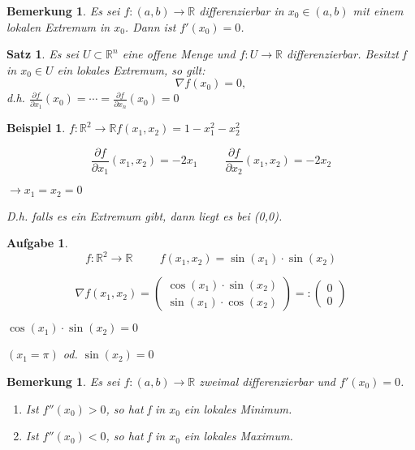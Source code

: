 \documentclass[12pt,a4paper]{scrreprt}
\newtheorem{bemerkung}[defi]{Bemerkung}
\newtheorem{beispiel}[defi]{Beispiel}
\newtheorem{satz}[defi]{Satz}
\newtheorem{aufg}[defi]{Aufgabe}
\begin{document}
\begin{bemerkung}
	Es sei $f:(a,b)\to\mathbb{R}$ differenzierbar in $x_0\in (a,b)$ mit einem lokalen Extremum in $x_0$. Dann ist $f'(x_0)=0$.
\end{bemerkung}

\begin{satz}
	Es sei $U \subset \mathbb{R}^n$ eine offene Menge und $f:U\to\mathbb{R}$ differenzierbar. Besitzt f in $x_0\in U$ ein lokales Extremum, so gilt:
	\[\nabla f(x_0)=0,\]
	d.h. $\frac{\partial f}{\partial x_1}(x_0)=\cdots=\frac{\partial f}{\partial x_n}(x_0)=0$
\end{satz}

\begin{beispiel}
	$f:\mathbb{R}^2\to\mathbb{R}$\hspace{1cm}$f(x_1,x_2)=1-x_1^2-x_2^2$
	
	\[\frac{\partial f}{\partial x_1}(x_1,x_2)=-2x_1\hspace{1cm}\frac{\partial f}{\partial x_2}(x_1,x_2)=-2x_2\]
	
	$\to x_1=x_2=0$
	
	D.h. falls es ein Extremum gibt, dann liegt es bei (0,0).
\end{beispiel}

\begin{aufg}
	\[f:\mathbb{R}^2\to\mathbb{R}\hspace{1cm}f(x_1,x_2)=\sin(x_1)\cdot\sin(x_2)\]

	\[\nabla f(x_1,x_2)=\begin{pmatrix}
		\cos(x_1)\cdot\sin(x_2) \\
		\sin(x_1)\cdot\cos(x_2)
	\end{pmatrix} =: \begin{pmatrix}0 \\ 0\end{pmatrix}\]

		$\cos(x_1)\cdot\sin(x_2)=0$

		$(x_1=\pi)$ od. $\sin(x_2)=0$
\end{aufg}

\begin{bemerkung}
	Es sei $f:(a,b)\to\mathbb{R}$ zweimal differenzierbar und $f'(x_0)=0$.
	\begin{enumerate}[label=(\roman*)]
		\item Ist $f''(x_0)>0$, so hat f in $x_0$ ein lokales Minimum.
		\item Ist $f''(x_0)<0$, so hat f in $x_0$ ein lokales Maximum.
	\end{enumerate}
\end{bemerkung}
\end{document}
